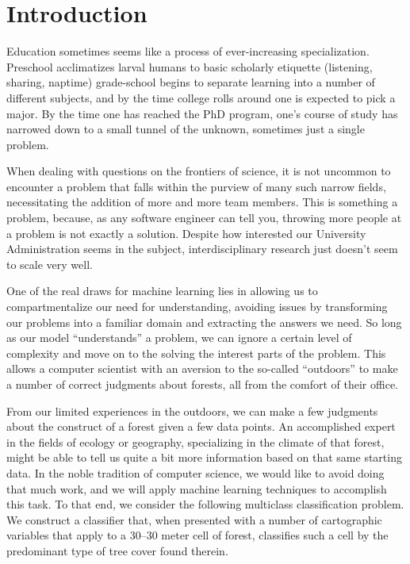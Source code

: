 \section{Introduction}
\label{sec:-intro}

Education sometimes seems like a process of ever-increasing 
specialization. Preschool acclimatizes larval humans to basic
scholarly etiquette (listening, sharing, naptime) grade-school begins 
to separate learning into a number of different subjects, and by the 
time college rolls around one is expected to pick a major.  By the time 
one has reached the PhD program, one's course of study has narrowed 
down to a small tunnel of the unknown, sometimes just a single problem.

When dealing with questions on the frontiers of science, it is not 
uncommon to encounter a problem that falls within the purview of many
such narrow fields, necessitating the addition of more and more team 
members.  This is something a problem, because, as any software engineer 
can tell you\cite{mythical}, throwing more people at a problem is not 
exactly a solution.  Despite how interested our University 
Administration seems in the subject, interdisciplinary research 
just doesn't seem to scale very well.

One of the real draws for machine learning lies in allowing us to 
compartmentalize our need for understanding, avoiding issues by 
transforming our problems into a familiar domain and extracting 
the answers we need.  So long as our model ``understands'' a problem, 
we can ignore a certain level of complexity and move on to the 
solving the interest parts of the problem.  This allows a computer 
scientist with an aversion to the so-called ``outdoors'' to make a 
number of correct judgments about forests, all from the comfort of 
their office.

From our limited experiences in the outdoors, we can make a few judgments about
the construct of a forest given a few data points. An accomplished expert 
in the fields of ecology or geography, specializing in the climate of 
that forest, might be able to tell us quite a bit more information based 
on that same starting data.  In the noble tradition of computer science, we 
would like to avoid doing that much work, and we will apply machine 
learning techniques to accomplish this task.  To that end, we consider 
the following multiclass classification problem. We construct a 
classifier that, when presented with a number of cartographic variables 
that apply to a 30--30 meter cell of forest, classifies such a cell by 
the predominant type of tree cover found therein.

